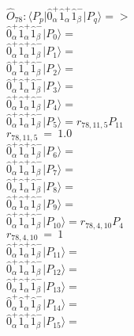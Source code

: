 \documentclass[14pt]{article}
\begin{document}
    $\hat{O}_{78}:  \langle{P_p}\vert \hat{0}_{\alpha}^{+}\hat{1}_{\alpha}^{+}\hat{1}_{\beta}^{-} \vert{P_q}\rangle => $ \\ 
    $ \hat{0}_{\alpha}^{+}\hat{1}_{\alpha}^{+}\hat{1}_{\beta}^{-} \vert{P_{0}}\rangle =  $ \\ 
    $ \hat{0}_{\alpha}^{+}\hat{1}_{\alpha}^{+}\hat{1}_{\beta}^{-} \vert{P_{1}}\rangle =  $ \\ 
    $ \hat{0}_{\alpha}^{+}\hat{1}_{\alpha}^{+}\hat{1}_{\beta}^{-} \vert{P_{2}}\rangle =  $ \\ 
    $ \hat{0}_{\alpha}^{+}\hat{1}_{\alpha}^{+}\hat{1}_{\beta}^{-} \vert{P_{3}}\rangle =  $ \\ 
    $ \hat{0}_{\alpha}^{+}\hat{1}_{\alpha}^{+}\hat{1}_{\beta}^{-} \vert{P_{4}}\rangle =  $ \\ 
    $ \hat{0}_{\alpha}^{+}\hat{1}_{\alpha}^{+}\hat{1}_{\beta}^{-} \vert{P_{5}}\rangle = {r}_{78,11,5}P_{11} $ \\ 
    ${r}_{78,11,5}\ =\ 1.0 $ \\ 
    $ \hat{0}_{\alpha}^{+}\hat{1}_{\alpha}^{+}\hat{1}_{\beta}^{-} \vert{P_{6}}\rangle =  $ \\ 
    $ \hat{0}_{\alpha}^{+}\hat{1}_{\alpha}^{+}\hat{1}_{\beta}^{-} \vert{P_{7}}\rangle =  $ \\ 
    $ \hat{0}_{\alpha}^{+}\hat{1}_{\alpha}^{+}\hat{1}_{\beta}^{-} \vert{P_{8}}\rangle =  $ \\ 
    $ \hat{0}_{\alpha}^{+}\hat{1}_{\alpha}^{+}\hat{1}_{\beta}^{-} \vert{P_{9}}\rangle =  $ \\ 
    $ \hat{0}_{\alpha}^{+}\hat{1}_{\alpha}^{+}\hat{1}_{\beta}^{-} \vert{P_{10}}\rangle = {r}_{78,4,10}P_{4} $ \\ 
    ${r}_{78,4,10}\ =\ 1 $ \\ 
    $ \hat{0}_{\alpha}^{+}\hat{1}_{\alpha}^{+}\hat{1}_{\beta}^{-} \vert{P_{11}}\rangle =  $ \\ 
    $ \hat{0}_{\alpha}^{+}\hat{1}_{\alpha}^{+}\hat{1}_{\beta}^{-} \vert{P_{12}}\rangle =  $ \\ 
    $ \hat{0}_{\alpha}^{+}\hat{1}_{\alpha}^{+}\hat{1}_{\beta}^{-} \vert{P_{13}}\rangle =  $ \\ 
    $ \hat{0}_{\alpha}^{+}\hat{1}_{\alpha}^{+}\hat{1}_{\beta}^{-} \vert{P_{14}}\rangle =  $ \\ 
    $ \hat{0}_{\alpha}^{+}\hat{1}_{\alpha}^{+}\hat{1}_{\beta}^{-} \vert{P_{15}}\rangle =  $ \\ 
    
\end{document}
